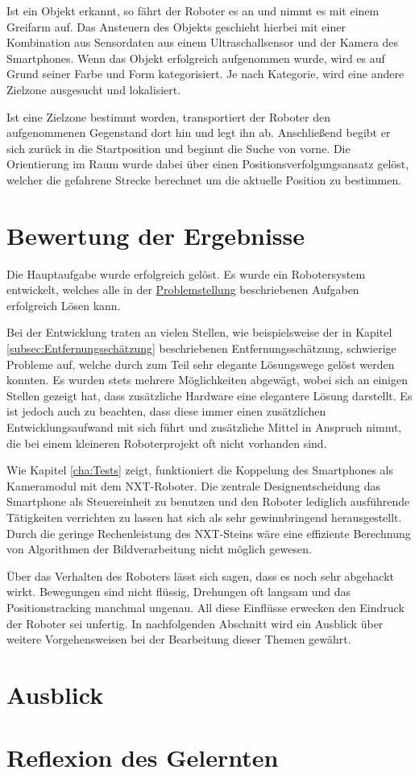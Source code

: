 Ist ein Objekt erkannt, so fährt der Roboter es an und nimmt es mit einem Greifarm auf. Das Ansteuern des Objekts geschieht hierbei mit einer Kombination aus Sensordaten aus einem Ultraschallsensor und der Kamera des Smartphones. Wenn das Objekt erfolgreich aufgenommen wurde, wird es auf Grund seiner Farbe und Form kategorisiert. Je nach Kategorie, wird eine andere Zielzone ausgesucht und lokalisiert.

Ist eine Zielzone bestimmt worden, transportiert der Roboter den aufgenommenen Gegenstand dort hin und legt ihn ab. Anschließend begibt er sich zurück in die Startposition und beginnt die Suche von vorne. Die Orientierung im Raum wurde dabei über einen Positionsverfolgungsansatz gelöst, welcher die gefahrene Strecke berechnet um die aktuelle Position zu bestimmen.

\section{Bewertung der Ergebnisse}

Die Hauptaufgabe wurde erfolgreich gelöst. Es wurde ein Robotersystem entwickelt, welches alle in der \hyperref[cha:Problemstellung]{Problemstellung} beschriebenen Aufgaben erfolgreich Lösen kann. 

Bei der Entwicklung traten an vielen Stellen, wie beispielsweise der in Kapitel \ref{subsec:Entfernungsschätzung} beschriebenen Entfernungsschätzung, schwierige Probleme auf, welche durch zum Teil sehr elegante Lösungswege gelöst werden konnten. Es wurden stets mehrere Möglichkeiten abgewägt, wobei sich an einigen Stellen gezeigt hat, dass zusätzliche Hardware eine elegantere Lösung darstellt. Es ist jedoch auch zu beachten, dass diese immer einen zusätzlichen Entwicklungsaufwand mit sich führt und zusätzliche Mittel in Anspruch nimmt, die bei einem kleineren Roboterprojekt oft nicht vorhanden sind. 

Wie Kapitel \ref{cha:Tests} zeigt, funktioniert die Koppelung des Smartphones als Kameramodul mit dem NXT-Roboter. Die zentrale Designentscheidung das Smartphone als Steuereinheit zu benutzen und den Roboter lediglich ausführende Tätigkeiten verrichten zu lassen hat sich als sehr gewinnbringend herausgestellt. Durch die geringe Rechenleistung des NXT-Steins wäre eine effiziente Berechnung von Algorithmen der Bildverarbeitung nicht möglich gewesen.

Über das Verhalten des Roboters lässt sich sagen, dass es noch sehr abgehackt wirkt. Bewegungen sind nicht flüssig, Drehungen oft langsam und das Positionstracking manchmal ungenau. All diese Einflüsse erwecken den Eindruck der Roboter sei unfertig. In nachfolgenden Abschnitt wird ein Ausblick über weitere Vorgehensweisen bei der Bearbeitung dieser Themen gewährt.

\section{Ausblick}
\section{Reflexion des Gelernten}